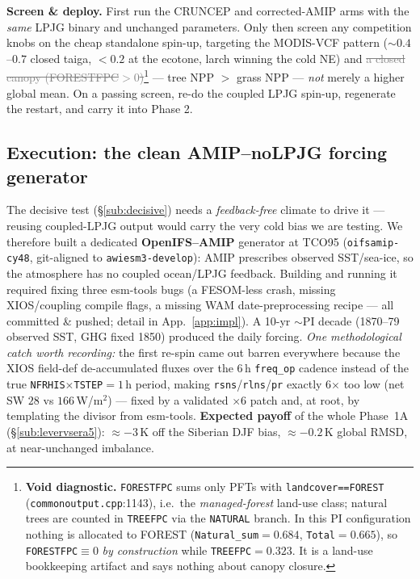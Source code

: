 \documentclass[10pt]{article}
\newcommand{\dead}[1]{\textcolor{gray}{\sout{#1}}}
\begin{document}
\textbf{Screen \& deploy.} First run the CRUNCEP and corrected-AMIP arms with the \emph{same} LPJG binary and
unchanged parameters. Only then screen any competition knobs on the cheap standalone spin-up, targeting the
MODIS-VCF pattern ($\sim0.4$--$0.7$ closed taiga,
$<0.2$ at the ecotone, larch winning the cold NE) and \dead{a closed canopy (FORESTFPC$>0$)}\footnote{\textbf{Void diagnostic.} \texttt{FORESTFPC} sums only PFTs with \texttt{landcover==FOREST} (\texttt{commonoutput.cpp}:1143), i.e.\ the \emph{managed-forest} land-use class; natural trees are counted in \texttt{TREEFPC} via the \texttt{NATURAL} branch. In this PI configuration nothing is allocated to FOREST (\texttt{Natural\_sum}$=0.684$, \texttt{Total}$=0.665$), so \texttt{FORESTFPC}$\equiv0$ \emph{by construction} while \texttt{TREEFPC}$=0.323$. It is a land-use bookkeeping artifact and says nothing about canopy closure.} --- tree NPP $>$ grass NPP ---
\emph{not} merely a higher global mean. On a passing screen, re-do the coupled LPJG spin-up, regenerate the restart,
and carry it into Phase 2.

\subsection{Execution: the clean AMIP--noLPJG forcing generator}\label{sub:amipgen}
The decisive test (\S\ref{sub:decisive}) needs a \emph{feedback-free} climate to drive it --- reusing coupled-LPJG
output would carry the very cold bias we are testing. We therefore built a dedicated \textbf{OpenIFS--AMIP} generator
at TCO95 (\texttt{oifsamip-cy48}, git-aligned to \texttt{awiesm3-develop}): AMIP prescribes observed SST/sea-ice, so
the atmosphere has no coupled ocean/LPJG feedback. Building and running it required fixing three esm-tools bugs (a
FESOM-less crash, missing XIOS/coupling compile flags, a missing WAM date-preprocessing recipe --- all committed \&
pushed; detail in App.~\ref{app:impl}). A 10-yr $\sim$PI decade (1870--79 observed SST, GHG fixed 1850) produced the
daily forcing. \emph{One methodological catch worth recording:} the first re-spin came out barren everywhere because
the XIOS field-def de-accumulated fluxes over the 6\,h \texttt{freq\_op} cadence instead of the true
\texttt{NFRHIS$\times$TSTEP}$=1$\,h period, making \texttt{rsns}/\texttt{rlns}/\texttt{pr} exactly 6$\times$ too low
(net SW $28$ vs $166$\,W/m$^2$) --- fixed by a validated $\times6$ patch and, at root, by templating the divisor from
esm-tools. \textbf{Expected payoff} of the whole Phase~1A (\S\ref{sub:levervsera5}): $\approx-3$\,K off the Siberian
DJF bias, $\approx-0.2$\,K global RMSD, at near-unchanged imbalance.
\end{document}
